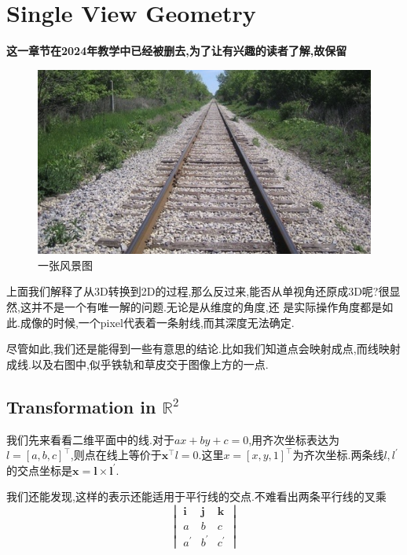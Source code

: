 \chapter{Single View Geometry}

\textbf{这一章节在2024年教学中已经被删去,为了让有兴趣的读者了解,故保留}

\begin{figure}
	\includegraphics[scale=0.35]{figures/pic_1.png}
	\caption{一张风景图}
\end{figure}
上面我们解释了从3D转换到2D的过程,那么反过来,能否从单视角还原成3D呢?很显然,这并不是一个有唯一解的问题.无论是从维度的角度,还
是实际操作角度都是如此.成像的时候,一个pixel代表着一条射线,而其深度无法确定.

尽管如此,我们还是能得到一些有意思的结论.比如我们知道点会映射成点,而线映射成线.以及右图中,似乎铁轨和草皮交于图像上方的一点.


\section{Transformation in $\mathbb R^2$}

我们先来看看二维平面中的线.对于$ax+by+c = 0$,用齐次坐标表达为$l = [a, b, c]^\top$,则点在线上等价于$\bm x^\top l = 0$.这里$x = [x, y, 1]^\top$为齐次坐标.两条线$l, l^\prime$的交点坐标是$\bm x = \bm l \times \bm l^\prime$.

我们还能发现,这样的表示还能适用于平行线的交点.不难看出两条平行线的叉乘
\begin{equation}
	\begin{vmatrix}
		\bm i & \bm j &\bm k
		\\
		a & b & c
		\\
		a^\prime & b^\prime & c^\prime
	\end{vmatrix}
\end{equation}

